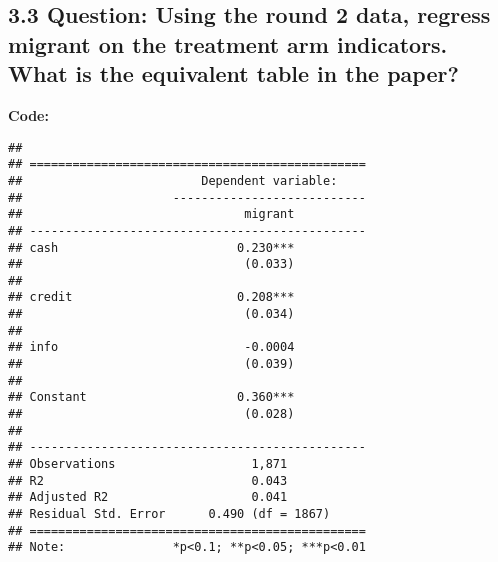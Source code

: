 \documentclass[
]{article}
\newenvironment{Shaded}{\begin{snugshade}}{\end{snugshade}}
\newcommand{\AttributeTok}[1]{\textcolor[rgb]{0.13,0.29,0.53}{#1}}
\newcommand{\ConstantTok}[1]{\textcolor[rgb]{0.56,0.35,0.01}{#1}}
\newcommand{\FloatTok}[1]{\textcolor[rgb]{0.00,0.00,0.81}{#1}}
\newcommand{\FunctionTok}[1]{\textcolor[rgb]{0.13,0.29,0.53}{\textbf{#1}}}
\newcommand{\NormalTok}[1]{#1}
\newcommand{\OtherTok}[1]{\textcolor[rgb]{0.56,0.35,0.01}{#1}}
\newcommand{\SpecialCharTok}[1]{\textcolor[rgb]{0.81,0.36,0.00}{\textbf{#1}}}
\newcommand{\StringTok}[1]{\textcolor[rgb]{0.31,0.60,0.02}{#1}}
\begin{document}
\clearpage

\hypertarget{question-using-the-round-2-data-regress-migrant-on-the-treatment-arm-indicators.-what-is-the-equivalent-table-in-the-paper}{%
\subsection{\texorpdfstring{3.3 \textbf{Question: Using the round 2
data, regress migrant on the treatment arm indicators. What is the
equivalent table in the
paper?}}{3.3 Question: Using the round 2 data, regress migrant on the treatment arm indicators. What is the equivalent table in the paper?}}\label{question-using-the-round-2-data-regress-migrant-on-the-treatment-arm-indicators.-what-is-the-equivalent-table-in-the-paper}}

\textbf{Code:}

\begin{Shaded}
\end{Shaded}

\begin{verbatim}
## 
## ===============================================
##                         Dependent variable:    
##                     ---------------------------
##                               migrant          
## -----------------------------------------------
## cash                         0.230***          
##                               (0.033)          
##                                                
## credit                       0.208***          
##                               (0.034)          
##                                                
## info                          -0.0004          
##                               (0.039)          
##                                                
## Constant                     0.360***          
##                               (0.028)          
##                                                
## -----------------------------------------------
## Observations                   1,871           
## R2                             0.043           
## Adjusted R2                    0.041           
## Residual Std. Error      0.490 (df = 1867)     
## ===============================================
## Note:               *p<0.1; **p<0.05; ***p<0.01
\end{verbatim}
\end{document}
